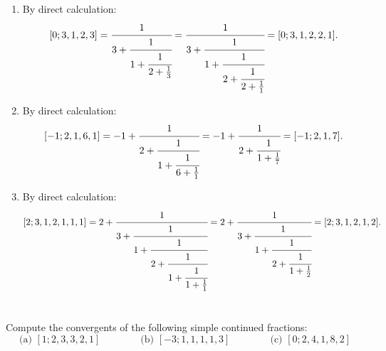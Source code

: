 \begin{solution}
    \begin{enumerate}
        \item By direct calculation:
        $$[0; 3, 1, 2, 3] = \cfrac{1}{
            3 + \cfrac{1}{
                1 + \cfrac{1}{
                    2 + \frac{1}{3}
                }
            }
        } = \cfrac{1}{
            3 + \cfrac{1}{
                1 + \cfrac{1}{
                    2 + \cfrac{1}{
                        2 + \frac{1}{1}
                    }
                }
            }
        } = [0; 3, 1, 2, 2, 1].$$
        \item By direct calculation:
        $$[-1; 2, 1, 6, 1] = -1 + \cfrac{1}{
            2 + \cfrac{1}{
                1 + \cfrac{1}{
                    6 + \frac{1}{1}
                }
            }
        } = -1 + \cfrac{1}{
            2 + \cfrac{1}{
                1 + \frac{1}{7}
            }
        } = [-1; 2, 1, 7].$$
        \item By direct calculation:
        $$[2; 3, 1, 2, 1, 1, 1] = 2 + \cfrac{1}{
            3 + \cfrac{1}{
                1 + \cfrac{1}{
                    2 + \cfrac{1}{
                        1 + \cfrac{1}{
                            1 + \frac{1}{1}
                        }
                    }
                }
            }
        } = 2 + \cfrac{1}{
            3 + \cfrac{1}{
                1 + \cfrac{1}{
                    2 + \cfrac{1}{
                        1 + \frac{1}{2}
                    }
                }
            }
        }  = [2; 3, 1, 2, 1, 2].$$ \\
    \end{enumerate}
\end{solution}

\begin{exercise}
    Compute the convergents of the following simple continued fractions:
    $$\text{(a) } [1; 2, 3, 3, 2, 1] \qquad \qquad \text{(b) } [-3; 1, 1, 1, 1, 3] \qquad \qquad \text{(c) } [0; 2, 4, 1, 8, 2]$$
\end{exercise}

